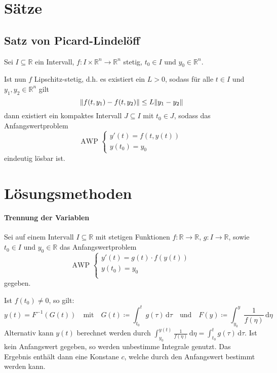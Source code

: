 		\section{Sätze}
			\subsection{Satz von Picard-Lindelöff}
				Sei $ I \subseteq \mathbb{R} $ ein Intervall, $ f : I \times \mathbb{R} ^ n \rightarrow \mathbb{R} ^ n $ stetig, $ t _ 0 \in I $ und $ y _ 0 \in \mathbb{R} ^ n $.

				Ist nun $ f $ Lipschitz-stetig, d.h. es existiert ein $ L > 0 $, sodass für alle $ t \in I $ und $ y _ 1, y _ 2 \in \mathbb{R} ^ n $ gilt \[ \norm{f(t, y _ 1) - f(t, y _ 2)} \leq L\norm{y _ 1 - y _ 2} \] dann existiert ein kompaktes Intervall $ J \subseteq I $ mit $ t _ 0 \in J $, sodass das Anfangswertproblem
				\begin{equation*}
					\text{AWP }
					\begin{cases}
						y'(t) = f(t, y(t)) \\
						y(t _ 0) = y _ 0
					\end{cases}
				\end{equation*}
				eindeutig lösbar ist.

		\section{Lösungsmethoden}
			\paragraph{Trennung der Variablen}
				Sei auf einem Intervall $ I \subseteq \mathbb{R} $ mit stetigen Funktionen $ f : \mathbb{R} \rightarrow \mathbb{R} $, $ g : I \rightarrow \mathbb{R} $, sowie $ t _ 0 \in I $ und $ y _ 0 \in \mathbb{R} $ das Anfangswertproblem
				\begin{equation*}
					\text{AWP }
					\begin{cases}
						y'(t) = g(t) \cdot f(y(t)) \\
						y(t _ 0) = y _ 0           \\
					\end{cases}
				\end{equation*}
				gegeben.

				Ist $ f(t _ 0) \neq 0 $, so gilt:
				\begin{equation*}
					y(t) = F ^ { -1 } (G(t)) \quad\text{mit}\quad G(t) \coloneqq \int _ { t _ 0 } ^ t \! g(\tau) \, \mathrm{d}\tau \quad\text{und}\quad F(y) \coloneqq \int _ { y _ 0 } ^ y \! \frac{1}{f(\eta)} \, \mathrm{d}\eta
				\end{equation*}
				Alternativ kann $ y(t) $ berechnet werden durch $ \int _ { y _ 0 } ^ { y(t) } \! \frac{1}{f(\eta)} \, \mathrm{d}\eta = \int _ { t _ 0 } ^ { t } \! g(\tau) \, \mathrm{d}\tau $. Ist kein Anfangswert gegeben, so werden unbestimme Integrale genutzt. Das Ergebnis enthält dann eine Konstane $ c $, welche durch den Anfangswert bestimmt werden kann.

